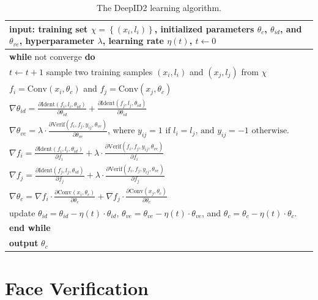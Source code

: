 \documentclass{article} %
\begin{document}
\begin{table}[t]
\caption{The DeepID2 learning algorithm.}
\label{tab:learn}
\begin{center}
\begin{tabular}{p{350pt}}
\toprule
\textbf{input}: training set $\chi=\left\{(x_i,l_i)\right\}$, initialized parameters $\theta_c$, $\theta_{id}$, and $\theta_{ve}$, hyperparameter $\lambda$, learning rate $\eta(t)$, $t\gets 0$ \\
\midrule
\textbf{while} not converge \textbf{do} \\
\quad $t\gets t+1$
\quad sample two training samples $(x_i,l_i)$ and $(x_j,l_j)$ from $\chi$ \\
\quad $f_i=\textrm{Conv}(x_i,\theta_c)$ and $f_j=\textrm{Conv}(x_j,\theta_c)$ \\
\quad $\nabla\theta_{id}=\frac{\partial\textrm{Ident}(f_i,l_i,\theta_{id})}{\partial\theta_{id}} + \frac{\partial\textrm{Ident}(f_j,l_j,\theta_{id})}{\partial\theta_{id}}$ \\
\quad $\nabla\theta_{ve}=\lambda\cdot\frac{\partial\textrm{Verif}(f_i,f_j,y_{ij},\theta_{ve})}{\partial\theta_{ve}}$, where $y_{ij}=1 \textrm{ if } l_i=l_j \textrm{, and } y_{ij}=-1 \textrm{ otherwise.}$ \\
\quad $\nabla f_i=\frac{\partial\textrm{Ident}(f_i,l_i,\theta_{id})}{\partial f_i} + \lambda\cdot\frac{\partial\textrm{Verif}(f_i,f_j,y_{ij},\theta_{ve})}{\partial f_i}$ \\
\quad $\nabla f_j=\frac{\partial\textrm{Ident}(f_j,l_j,\theta_{id})}{\partial f_j} + \lambda\cdot\frac{\partial\textrm{Verif}(f_i,f_j,y_{ij},\theta_{ve})}{\partial f_j}$ \\
\quad $\nabla \theta_c=\nabla f_i\cdot\frac{\partial\textrm{Conv}(x_i,\theta_c)}{\partial\theta_c} + \nabla f_j\cdot\frac{\partial\textrm{Conv}(x_j,\theta_c)}{\partial\theta_c}$ \\
\quad update $\theta_{id}=\theta_{id}-\eta(t)\cdot\theta_{id}$, $\theta_{ve}=\theta_{ve}-\eta(t)\cdot\theta_{ve}$, and $\theta_{c}=\theta_{c}-\eta(t)\cdot\theta_{c}$. \\
\textbf{end while} \\
\textbf{output} $\theta_c$ \\
\bottomrule
\end{tabular}
\end{center}
\end{table}


\section{Face Verification}
\end{document}
